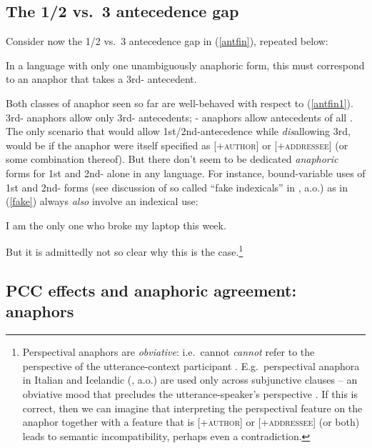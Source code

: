 \documentclass[output=paper, modfonts, nonflat]{langsci/langscibook}
\begin{document}
\subsection{The 1/2 vs.\ 3 antecedence gap}

Consider now the 1/2 vs.\ 3 antecedence gap in (\ref{antfin}), repeated
below: 

\ea\label{antfin1} In a language with only one unambiguously anaphoric
form, this must correspond to an anaphor that takes a 3rd-\person{}
antecedent.  \z 

\noindent Both classes of anaphor seen so far are well-behaved with respect to
(\ref{antfin1}).  3rd-\person{} anaphors allow only 3rd-\person{}
antecedents; \nul-\person{} anaphors allow antecedents of all
\person. The only scenario that would allow 1st/2nd-antecedence while
\emph{dis}allowing 3rd, would be if the anaphor were itself specified
as [$+$\textsc{author}] or [$+$\textsc{addressee}] (or some combination thereof). But
there don't seem to be dedicated \emph{anaphoric} forms for 1st and
2nd-\person{} alone in any language. For instance, bound-variable uses
of 1st and 2nd-\person{} forms (see discussion of so called
``fake indexicals'' in \citealt{vonstechow:2002, kratzer:2009}, a.o.) as in
(\ref{fake}) always {\itshape also} involve an indexical use: \vspace{-1ex}

\ea\label{fake} I am the only one who broke my laptop this week.  \z

\noindent But it is admittedly not so clear why this is the case.\footnote{%
  Perspectival anaphors are {\itshape obviative}: i.e.\ cannot {\itshape cannot}
  refer to the perspective of the utterance-context participant
  \citep{sundaresan:2012, sundaresan:2018, sundaresanpearson:2014}. 
  E.g.\ perspectival anaphora in Italian
  \citep{giorgi:2010} and Icelandic (\citealt{Hicks:2009,
    Reuland:2011}, a.o.) are used only across subjunctive clauses -- an
  obviative mood that precludes the utterance-speaker's perspective
  \citep{hellan:1988, sigurdsson:2010}. If this is correct, then we
  can imagine that interpreting the perspectival feature on the
  anaphor together with a feature that is [+\textsc{author}] or [+\textsc{addressee}]
  (or both) leads to semantic incompatibility, perhaps even a
  contradiction.}




\subsection{PCC effects and anaphoric agreement:  anaphors}
\end{document}
